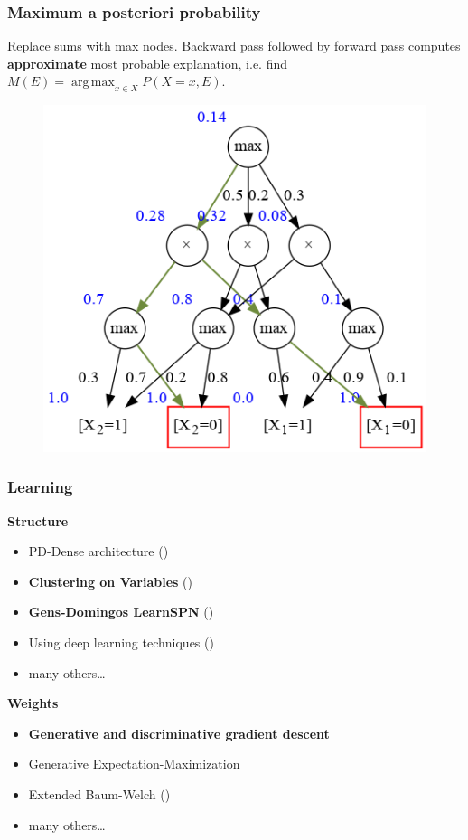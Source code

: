 \documentclass{beamer}
\DeclareMathOperator*{\argmax}{arg\,max}
\begin{document}
\begin{frame}
  \frametitle{Maximum a posteriori probability}

  Replace sums with max nodes. Backward pass followed by forward pass computes \textbf{approximate}
  most probable explanation, i.e. find $M(E)=\argmax_{x\in X} P(X=x, E)$.

  \begin{figure}
    \centering\includegraphics[height=0.6\textheight]{imgs/sample_mpn_prob.png}
  \end{figure}
\end{frame}

\begin{frame}
  \frametitle{Learning}

  \textbf{Structure}
  \begin{itemize}
    \item PD-Dense architecture (\cite{poon-domingos})
    \item \textbf{Clustering on Variables} (\cite{clustering})
    \item \textbf{Gens-Domingos LearnSPN} (\cite{gens-domingos})
    \item Using deep learning techniques (\cite{deep-learn-spn})
    \item many others\ldots
  \end{itemize}

  \textbf{Weights}
  \begin{itemize}
    \item \textbf{Generative and discriminative gradient descent}
    \item Generative Expectation-Maximization
    \item Extended Baum-Welch (\cite{baum-welch})
    \item many others\ldots
  \end{itemize}
\end{frame}
\end{document}
